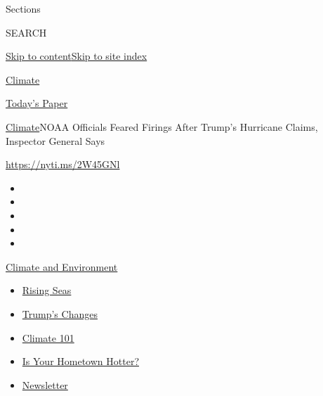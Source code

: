 Sections

SEARCH

\protect\hyperlink{site-content}{Skip to
content}\protect\hyperlink{site-index}{Skip to site index}

\href{https://www.nytimes.com/section/climate}{Climate}

\href{https://myaccount.nytimes.com/auth/login?response_type=cookie\&client_id=vi}{}

\href{https://www.nytimes.com/section/todayspaper}{Today's Paper}

\href{/section/climate}{Climate}\textbar{}NOAA Officials Feared Firings
After Trump's Hurricane Claims, Inspector General Says

\url{https://nyti.ms/2W45GNl}

\begin{itemize}
\item
\item
\item
\item
\item
\end{itemize}

\href{https://www.nytimes.com/section/climate?action=click\&pgtype=Article\&state=default\&region=TOP_BANNER\&context=storylines_menu}{Climate
and Environment}

\begin{itemize}
\tightlist
\item
  \href{https://www.nytimes.com/2020/07/30/climate/sea-level-inland-floods.html?action=click\&pgtype=Article\&state=default\&region=TOP_BANNER\&context=storylines_menu}{Rising
  Seas}
\item
  \href{https://www.nytimes.com/interactive/2020/climate/trump-environment-rollbacks.html?action=click\&pgtype=Article\&state=default\&region=TOP_BANNER\&context=storylines_menu}{Trump's
  Changes}
\item
  \href{https://www.nytimes.com/interactive/2020/04/19/climate/climate-crash-course-1.html?action=click\&pgtype=Article\&state=default\&region=TOP_BANNER\&context=storylines_menu}{Climate
  101}
\item
  \href{https://www.nytimes.com/interactive/2018/08/30/climate/how-much-hotter-is-your-hometown.html?action=click\&pgtype=Article\&state=default\&region=TOP_BANNER\&context=storylines_menu}{Is
  Your Hometown Hotter?}
\item
  \href{https://www.nytimes.com/newsletters/climate-change?action=click\&pgtype=Article\&state=default\&region=TOP_BANNER\&context=storylines_menu}{Newsletter}
\end{itemize}

